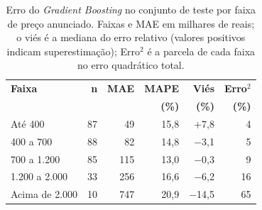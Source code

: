 \begin{table}[ht]
\centering
\caption{Erro do \textit{Gradient Boosting} no conjunto de teste por faixa de preço anunciado. Faixas e MAE em milhares de reais; o viés é a mediana do erro relativo (valores positivos indicam superestimação); Erro$^2$ é a parcela de cada faixa no erro quadrático total.}
\label{tab:faixas}
\small
\begin{tabular}{lrrrrr}
\toprule
\textbf{Faixa} & \textbf{n} & \textbf{MAE} & \textbf{MAPE} & \textbf{Viés} & \textbf{Erro$^2$} \\
& & & \textbf{(\%)} & \textbf{(\%)} & \textbf{(\%)} \\
\midrule
Até 400 & 87 & 49 & 15,8 & +7,8 & 4 \\
400 a 700 & 88 & 82 & 14,8 & $-$3,1 & 5 \\
700 a 1.200 & 85 & 115 & 13,0 & $-$0,3 & 9 \\
1.200 a 2.000 & 33 & 256 & 16,6 & $-$6,2 & 16 \\
Acima de 2.000 & 10 & 747 & 20,9 & $-$14,5 & 65 \\
\bottomrule
\end{tabular}
\end{table}
